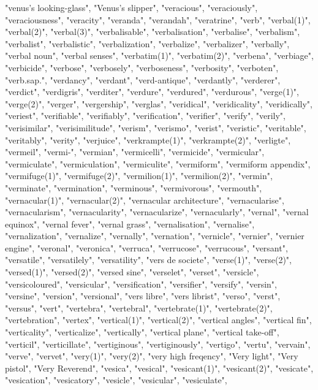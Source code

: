 "venus's looking-glass",
"Venus's slipper",
"veracious",
"veraciously",
"veraciousness",
"veracity",
"veranda",
"verandah",
"veratrine",
"verb",
"verbal(1)",
"verbal(2)",
"verbal(3)",
"verbalisable",
"verbalisation",
"verbalise",
"verbalism",
"verbalist",
"verbalistic",
"verbalization",
"verbalize",
"verbalizer",
"verbally",
"verbal noun",
"verbal senses",
"verbatim(1)",
"verbatim(2)",
"verbena",
"verbiage",
"verbicide",
"verbose",
"verbosely",
"verboseness",
"verbosity",
"verboten",
"verb.sap.",
"verdancy",
"verdant",
"verd-antique",
"verdantly",
"verderer",
"verdict",
"verdigris",
"verditer",
"verdure",
"verdured",
"verdurous",
"verge(1)",
"verge(2)",
"verger",
"vergership",
"verglas",
"veridical",
"veridicality",
"veridically",
"veriest",
"verifiable",
"verifiably",
"verification",
"verifier",
"verify",
"verily",
"verisimilar",
"verisimilitude",
"verism",
"verismo",
"verist",
"veristic",
"veritable",
"veritably",
"verity",
"verjuice",
"verkrampte(1)",
"verkrampte(2)",
"verligte",
"vermeil",
"vermi-",
"vermian",
"vermicelli",
"vermicide",
"vermicular",
"vermiculate",
"vermiculation",
"vermiculite",
"vermiform",
"vermiform appendix",
"vermifuge(1)",
"vermifuge(2)",
"vermilion(1)",
"vermilion(2)",
"vermin",
"verminate",
"vermination",
"verminous",
"vermivorous",
"vermouth",
"vernacular(1)",
"vernacular(2)",
"vernacular architecture",
"vernacularise",
"vernacularism",
"vernacularity",
"vernacularize",
"vernacularly",
"vernal",
"vernal equinox",
"vernal fever",
"vernal grass",
"vernalisation",
"vernalise",
"vernalization",
"vernalize",
"vernally",
"vernation",
"vernicle",
"vernier",
"vernier engine",
"veronal",
"veronica",
"verruca",
"verrucose",
"verrucous",
"versant",
"versatile",
"versatilely",
"versatility",
"vers de societe",
"verse(1)",
"verse(2)",
"versed(1)",
"versed(2)",
"versed sine",
"verselet",
"verset",
"versicle",
"versicoloured",
"versicular",
"versification",
"versifier",
"versify",
"versin",
"versine",
"version",
"versional",
"vers libre",
"vers librist",
"verso",
"verst",
"versus",
"vert",
"vertebra",
"vertebral",
"vertebrate(1)",
"vertebrate(2)",
"vertebration",
"vertex",
"vertical(1)",
"vertical(2)",
"vertical angles",
"vertical fin",
"verticality",
"verticalize",
"vertically",
"vertical plane",
"vertical take-off",
"verticil",
"verticillate",
"vertiginous",
"vertiginously",
"vertigo",
"vertu",
"vervain",
"verve",
"vervet",
"very(1)",
"very(2)",
"very high freqency",
"Very light",
"Very pistol",
"Very Reverend",
"vesica",
"vesical",
"vesicant(1)",
"vesicant(2)",
"vesicate",
"vesication",
"vesicatory",
"vesicle",
"vesicular",
"vesiculate",
